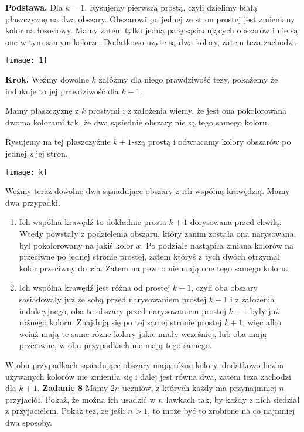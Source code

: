 \documentclass[12pt,a4paper]{article}
\begin{document}
\textbf{Podstawa.} Dla \(k=1\). Rysujemy pierwszą prostą, czyli dzielimy białą płaszczyznę na dwa obszary. Obszarowi po jednej ze stron prostej jest zmieniany kolor na łososiowy. Mamy zatem tylko jedną parę sąsiadujących obszarów i nie są one w tym samym kolorze. Dodatkowo użyte są dwa kolory, zatem teza zachodzi.

\begin{center}
	\texttt{[image: 1]}
\end{center}

\textbf{Krok.} Weźmy dowolne \(k\) załóżmy dla niego prawdziwość tezy, pokażemy że indukuje to jej prawdziwość dla \(k+1\).

Mamy płaszczyznę z \(k\) prostymi i z założenia wiemy, że jest ona pokolorowana dwoma kolorami tak, że dwa sąsiednie obszary nie są tego samego koloru.

Rysujemy na tej płaszczyźnie \(k+1\)-szą prostą i odwracamy kolory obszarów po jednej z jej stron.

\begin{center}
	\texttt{[image: k]}
\end{center}

Weźmy teraz dowolne dwa sąsiadujące obszary z ich wspólną krawędzią. Mamy dwa przypadki.

\begin{enumerate}
	\item Ich wspólna krawędź to dokładnie prosta \(k+1\) dorysowana przed chwilą. Wtedy powstały z podzielenia obszaru, który zanim została ona narysowana, był pokolorowany na jakiś kolor \(x\). Po podziale nastąpiła zmiana kolorów na przeciwne po jednej stronie prostej, zatem któryś z tych dwóch otrzymał kolor przeciwny do \(x\)'a. Zatem na pewno nie mają one tego samego koloru.
	\item Ich wspólna krawędź jest różna od prostej \(k+1\), czyli oba obszary sąsiadowały już ze sobą przed narysowaniem prostej \(k+1\) i z założenia indukcyjnego, oba te obszary przed narysowaniem prostej \(k+1\) były już różnego koloru. Znajdują się po tej samej stronie prostej \(k+1\), więc albo wciąż mają te same różne kolory jakie miały wcześniej, lub oba mają przeciwne, w obu przypadkach nie mają tego samego.
\end{enumerate}

W obu przypadkach sąsiadujące obszary mają różne kolory, dodatkowo liczba używanych kolorów nie zmieniła się i dalej jest równa dwa, zatem teza zachodzi dla \(k+1\).
\vskip 1cm
\noindent
\textbf{Zadanie 8} Mamy \(2n\) uczniów, z których każdy ma przynajmniej \(n\) przyjaciół. Pokaż, że można ich usadzić w \(n\) ławkach tak, by każdy z nich siedział z przyjacielem. Pokaż też, że jeśli \(n > 1\), to może być to zrobione na co najmniej dwa sposoby.
\vskip 0.2cm
\end{document}
